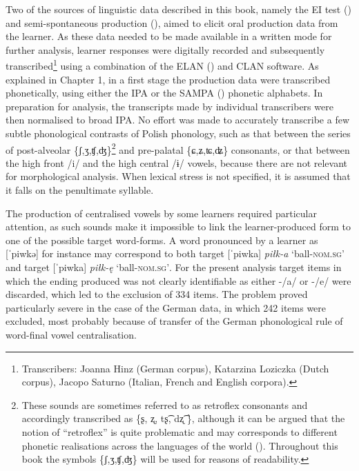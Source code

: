 Two of the sources of linguistic data described in this book, namely the EI test () and semi-spontaneous production (), aimed to elicit oral production data from the learner. As these data needed to be made available in a written mode for further analysis, learner responses were digitally recorded and subsequently transcribed\footnote{Transcribers: Joanna Hinz (German corpus), Katarzina Loziczka (Dutch corpus), Jacopo Saturno (Italian, French and English corpora).} using a combination of the ELAN (\citealt{BrugmanRussell2004}) and CLAN \citep{MacWhinney2000} software. As explained in Chapter 1, in a first stage the production data were transcribed phonetically, using either the IPA \citep{LandauEtAl1999} or the SAMPA (\citealt{Wells1997, Wells1995}) phonetic alphabets. In preparation for analysis, the transcripts made by individual transcribers were then normalised to broad IPA. No effort was made to accurately transcribe a few subtle phonological contrasts of Polish phonology, such as that between the series of post-alveolar \{ʃ,ʒ,ʧ,ʤ\}\footnote{These sounds are sometimes referred to as retroflex consonants and accordingly transcribed as \{ʂ, ʐ, tʂ͡, dʐ͡ \}, although it can be argued that the notion of ``retroflex'' is quite problematic and may corresponds to different phonetic realisations across the languages of the world (\citealt{Hamann2002, Hamann2003, Hamann2004, Żygis2003, ŻygisHamann2003, PadgettŻygis2007, ŻygisPadgett2010}). Throughout this book the symbols \{ʃ,ʒ,ʧ,ʤ\} will be used for reasons of readability.} and pre-palatal \{ɕ,ʑ,ʨ,ʥ\} consonants, or that between the high front /i/ and the high central /ɨ/ vowels, because there are not relevant for morphological analysis. When lexical stress is not specified, it is assumed that it falls on the penultimate syllable.

The production of centralised vowels by some learners required particular attention, as such sounds make it impossible to link the learner-produced form to one of the possible target word-forms. A word pronounced by a learner as [ˈpiwkə] for instance may correspond to both target [ˈpiwka] \textit{piłk-a} ‘ball-\textsc{nom.sg}’ and target [ˈpiwka] \textit{piłk-ę} ‘ball-\textsc{nom.sg’}. For the present analysis target items in which the ending produced was not clearly identifiable as either -/a/ or -/e/ were discarded, which led to the exclusion of 334 items. The problem proved particularly severe in the case of the German data, in which 242 items were excluded, most probably because of transfer of the German phonological rule of word-final vowel centralisation. 

